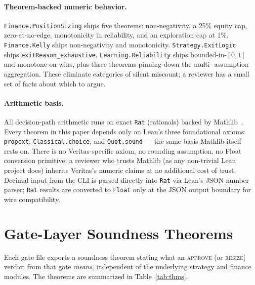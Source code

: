 \documentclass[11pt, a4paper]{article}
\begin{document}
\paragraph{Theorem-backed numeric behavior.}
\texttt{Finance.PositionSizing} ships five theorems: non-negativity,
a 25\% equity cap, zero-at-no-edge, monotonicity in reliability, and
an exploration cap at 1\%.
\texttt{Finance.Kelly} ships non-negativity and monotonicity.
\texttt{Strategy.ExitLogic} ships \texttt{exitReason\_exhaustive}.
\texttt{Learning.Reliability} ships bounded-in-$[0,1]$ and
monotone-on-wins, plus three theorems pinning down the multi-
assumption aggregation. These eliminate categories of silent
miscount; a reviewer has a small set of facts about which to argue.

\paragraph{Arithmetic basis.} All decision-path arithmetic runs on exact
\texttt{Rat} (rationals) backed by Mathlib~\cite{mathlib}. Every
theorem in this paper depends only on Lean's three foundational axioms:
\texttt{propext}, \texttt{Classical.choice}, and \texttt{Quot.sound} ---
the same basis Mathlib itself rests on. There is no Veritas-specific
axiom, no rounding assumption, no Float conversion primitive; a reviewer
who trusts Mathlib (as any non-trivial Lean project does) inherits
Veritas's numeric claims at no additional cost of trust. Decimal input
from the CLI is parsed directly into \texttt{Rat} via Lean's JSON
number parser; \texttt{Rat} results are converted to \texttt{Float}
only at the JSON output boundary for wire compatibility.

\section{Gate-Layer Soundness Theorems}
\label{sec:formal}

Each gate file exports a soundness theorem stating what an \textsc{approve}
(or \textsc{resize}) verdict from that gate \emph{means}, independent of
the underlying strategy and finance modules. The theorems are summarized
in Table~\ref{tab:thms}.
\end{document}
